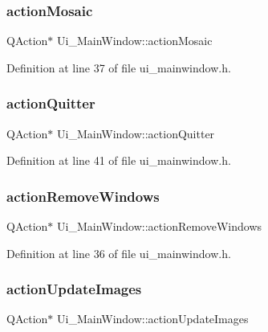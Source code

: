 \subsubsection{\texorpdfstring{actionMosaic}{actionMosaic}}
{\footnotesize\ttfamily Q\+Action$\ast$ Ui\+\_\+\+Main\+Window\+::action\+Mosaic}



Definition at line 37 of file ui\+\_\+mainwindow.\+h.

\mbox{\label{class_ui___main_window_a3d416f0c4ac4511347e24a06d4f58e85}} 
\subsubsection{\texorpdfstring{actionQuitter}{actionQuitter}}
{\footnotesize\ttfamily Q\+Action$\ast$ Ui\+\_\+\+Main\+Window\+::action\+Quitter}



Definition at line 41 of file ui\+\_\+mainwindow.\+h.

\mbox{\label{class_ui___main_window_a8560857e3b9016cef6bab384f17d38c0}} 
\subsubsection{\texorpdfstring{actionRemoveWindows}{actionRemoveWindows}}
{\footnotesize\ttfamily Q\+Action$\ast$ Ui\+\_\+\+Main\+Window\+::action\+Remove\+Windows}



Definition at line 36 of file ui\+\_\+mainwindow.\+h.

\mbox{\label{class_ui___main_window_a5e565d3d7403e3ce05d626549b683ab7}} 
\subsubsection{\texorpdfstring{actionUpdateImages}{actionUpdateImages}}
{\footnotesize\ttfamily Q\+Action$\ast$ Ui\+\_\+\+Main\+Window\+::action\+Update\+Images}



